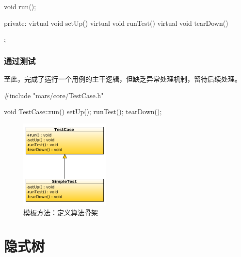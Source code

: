 \begin{content}
\begin{leftbar}
\begin{c++}[caption={\ttfamily{include/mars/core/TestCase.h}}]
{  void run();

private:
  virtual void setUp() {}
  virtual void runTest() {}
  virtual void tearDown() {}
};
  \end{c++}
\end{leftbar}

\subsubsection{通过测试}

至此，完成了运行一个用例的主干逻辑，但缺乏异常处理机制，留待后续处理。

\begin{leftbar}
 \begin{c++}[caption={\ttfamily{src/mars/core/TestCase.cc}}]
#include "mars/core/TestCase.h"

void TestCase::run() {
  setUp();
  runTest();
  tearDown();
}
 \end{c++}
\end{leftbar}

\begin{figure}[H]
\centering
\includegraphics[width=0.4\textwidth]{figures/xunit/simple-test.png}
\caption{模板方法：定义算法骨架}
 \label{fig:simple-test}
\end{figure}

\end{content}

\section{隐式树}

